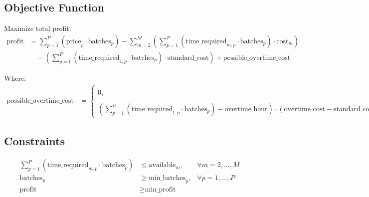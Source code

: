 \documentclass{article}
\begin{document}
\subsection*{Objective Function}
Maximize total profit:
\begin{align*}
\text{profit} & = \sum_{p=1}^{P} (\text{price}_{p} \cdot \text{batches}_{p}) - \sum_{m=2}^{M} \left( \sum_{p=1}^{P} (\text{time\_required}_{m,p} \cdot \text{batches}_{p}) \cdot \text{cost}_{m} \right) \\
& \quad - \left( \sum_{p=1}^{P} (\text{time\_required}_{1,p} \cdot \text{batches}_{p}) \cdot \text{standard\_cost} \right) + \text{possible\_overtime\_cost}
\end{align*}

Where:
\begin{align*}
\text{possible\_overtime\_cost} & = \begin{cases} 
0, & \text{if } \sum_{p=1}^{P} (\text{time\_required}_{1,p} \cdot \text{batches}_{p}) \leq \text{overtime\_hour} \\
\left( \sum_{p=1}^{P} (\text{time\_required}_{1,p} \cdot \text{batches}_{p}) - \text{overtime\_hour} \right) \cdot (\text{overtime\_cost} - \text{standard\_cost}), & \text{otherwise}
\end{cases}
\end{align*}

\subsection*{Constraints}
\begin{align*}
\sum_{p=1}^{P} (\text{time\_required}_{m,p} \cdot \text{batches}_{p}) & \leq \text{available}_{m}, & \forall m = 2, \ldots, M \\
\text{batches}_{p} & \geq \text{min\_batches}_{p}, & \forall p = 1, \ldots, P \\
\text{profit} & \geq \text{min\_profit}
\end{align*}
\end{document}
